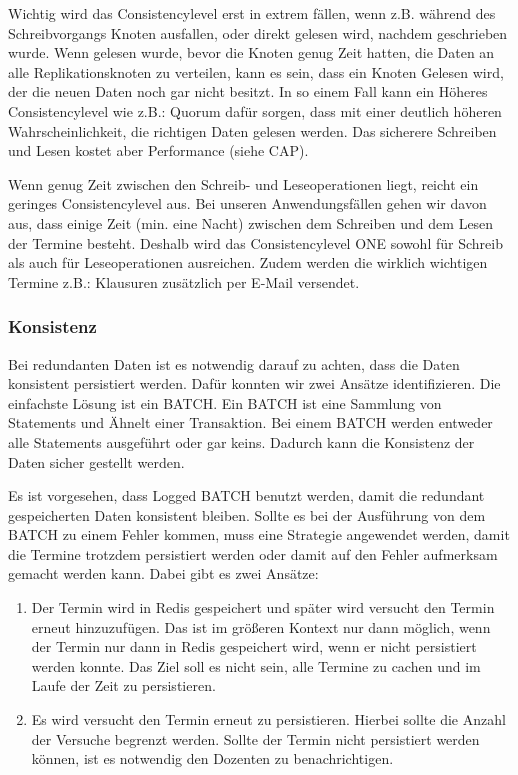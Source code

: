\vspace{6pt}

Wichtig wird das Consistencylevel erst in extrem fällen, wenn z.B. während des Schreibvorgangs Knoten ausfallen, oder direkt gelesen wird, nachdem geschrieben wurde. Wenn gelesen wurde, bevor die Knoten genug Zeit hatten, die Daten an alle Replikationsknoten zu verteilen, kann es sein, dass ein Knoten Gelesen wird, der die neuen Daten noch gar nicht besitzt. In so einem Fall kann ein Höheres Consistencylevel wie z.B.: Quorum dafür sorgen, dass mit einer deutlich höheren Wahrscheinlichkeit, die richtigen Daten gelesen werden. Das sicherere Schreiben und Lesen kostet aber Performance (siehe CAP).

\vspace{6pt}

Wenn genug Zeit zwischen den Schreib- und Leseoperationen liegt, reicht ein geringes Consistencylevel aus. Bei unseren Anwendungsfällen gehen wir davon aus, dass einige Zeit (min. eine Nacht) zwischen dem Schreiben und dem Lesen der Termine besteht. Deshalb wird das Consistencylevel ONE sowohl für Schreib als auch für Leseoperationen ausreichen. Zudem werden die wirklich wichtigen Termine z.B.: Klausuren zusätzlich per E-Mail versendet.

\vspace{12pt} 

\subsubsection{Konsistenz}
Bei redundanten Daten ist es notwendig darauf zu achten, dass die Daten konsistent persistiert werden. Dafür konnten wir zwei Ansätze identifizieren. Die einfachste Lösung ist ein BATCH. Ein BATCH ist eine Sammlung von Statements und Ähnelt einer Transaktion. Bei einem BATCH werden entweder alle Statements ausgeführt oder gar keins. Dadurch kann die Konsistenz der Daten sicher gestellt werden.

\vspace{6pt}

Es ist vorgesehen, dass Logged BATCH benutzt werden, damit die redundant gespeicherten Daten konsistent bleiben. Sollte es bei der Ausführung von dem BATCH zu einem Fehler kommen, muss eine Strategie angewendet werden, damit die Termine trotzdem persistiert werden oder damit auf den Fehler aufmerksam gemacht werden kann. Dabei gibt es zwei Ansätze: 

\begin{enumerate}
	\item Der Termin wird in Redis gespeichert und später wird versucht den Termin erneut hinzuzufügen. Das ist im größeren Kontext nur dann möglich, wenn der Termin nur dann in Redis gespeichert wird, wenn er nicht persistiert werden konnte. Das Ziel soll es nicht sein, alle Termine zu cachen und im Laufe der Zeit zu persistieren.
	\item Es wird versucht den Termin erneut zu persistieren. Hierbei sollte die Anzahl der Versuche begrenzt werden. Sollte der Termin nicht persistiert werden können, ist es notwendig den Dozenten zu benachrichtigen.
\end{enumerate}


